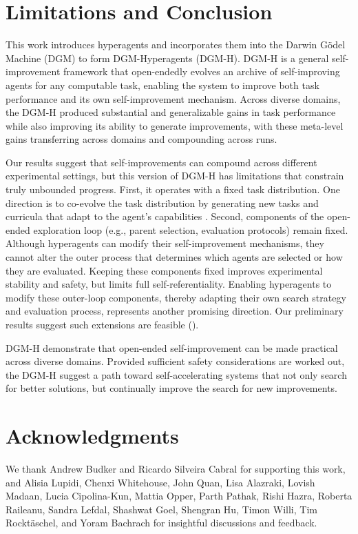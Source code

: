 \documentclass[]{fairmeta}
\begin{document}
\section{Limitations and Conclusion}
\label{sec:conclusion}

This work introduces hyperagents and incorporates them into the Darwin G\"odel Machine (DGM) to form DGM-Hyperagents (DGM-H). DGM-H is a general self-improvement framework that open-endedly evolves an archive of self-improving agents for any computable task, enabling the system to improve both task performance and its own self-improvement mechanism. Across diverse domains, the DGM-H produced substantial and generalizable gains in task performance while also improving its ability to generate improvements, with these meta-level gains transferring across domains and compounding across runs.

Our results suggest that self-improvements can compound across different experimental settings, but this version of DGM-H has limitations that constrain truly unbounded progress.
First, it operates with a fixed task distribution. One direction is to co-evolve the task distribution by generating new tasks and curricula that adapt to the agent's capabilities \citep{clune2019ai, zhangomni, faldoromni, bolton2025sima}.
Second, components of the open-ended exploration loop (e.g., parent selection, evaluation protocols) remain fixed. Although hyperagents can modify their self-improvement mechanisms, they cannot alter the outer process that determines which agents are selected or how they are evaluated. Keeping these components fixed improves experimental stability and safety, but limits full self-referentiality. Enabling hyperagents to modify these outer-loop components, thereby adapting their own search strategy and evaluation process, represents another promising direction. Our preliminary results suggest such extensions are feasible ().

DGM-H demonstrate that open-ended self-improvement can be made practical across diverse domains. Provided sufficient safety considerations are worked out, the DGM-H suggest a path toward self-accelerating systems that not only search for better solutions, but continually improve the search for new improvements.

\section*{Acknowledgments}
We thank Andrew Budker and Ricardo Silveira Cabral for supporting this work, and Alisia Lupidi, Chenxi Whitehouse, John Quan, Lisa Alazraki, Lovish Madaan, Lucia Cipolina-Kun, Mattia Opper, Parth Pathak, Rishi Hazra, Roberta Raileanu, Sandra Lefdal, Shashwat Goel, Shengran Hu, Timon Willi, Tim Rockt\"aschel, and Yoram Bachrach for insightful discussions and feedback.
\end{document}

